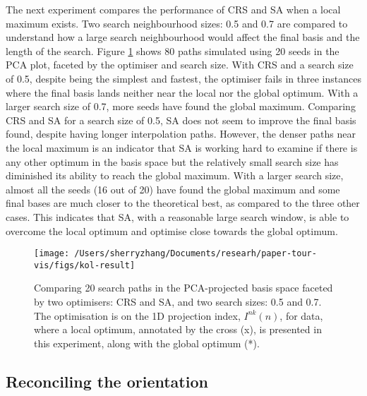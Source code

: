 The next experiment compares the performance of CRS and SA when a local
maximum exists. Two search neighbourhood sizes: 0.5 and 0.7 are compared
to understand how a large search neighbourhood would affect the final
basis and the length of the search. Figure \ref{fig:kol-result} shows 80
paths simulated using 20 seeds in the PCA plot, faceted by the optimiser
and search size. With CRS and a search size of 0.5, despite being the
simplest and fastest, the optimiser fails in three instances where the
final basis lands neither near the local nor the global optimum. With a
larger search size of 0.7, more seeds have found the global maximum.
Comparing CRS and SA for a search size of 0.5, SA does not seem to
improve the final basis found, despite having longer interpolation
paths. However, the denser paths near the local maximum is an indicator
that SA is working hard to examine if there is any other optimum in the
basis space but the relatively small search size has diminished its
ability to reach the global maximum. With a larger search size, almost
all the seeds (16 out of 20) have found the global maximum and some
final bases are much closer to the theoretical best, as compared to the
three other cases. This indicates that SA, with a reasonable large
search window, is able to overcome the local optimum and optimise close
towards the global optimum.

\begin{Schunk}
\begin{figure}

{\centering \texttt{[image: /Users/sherryzhang/Documents/researh/paper-tour-vis/figs/kol-result]} 

}

\caption[Comparing 20 search paths in the PCA-projected basis space faceted by two optimisers]{Comparing 20 search paths in the PCA-projected basis space faceted by two optimisers: CRS and SA, and two search sizes: 0.5 and 0.7. The optimisation is on the 1D projection index, $I^{nk}(n)$, for  data, where a local optimum, annotated by the cross (x), is presented in this experiment, along with the global optimum (*).}\label{fig:kol-result}
\end{figure}
\end{Schunk}

\hypertarget{reconciling-the-orientation}{%
\subsection{Reconciling the
orientation}\label{reconciling-the-orientation}}

